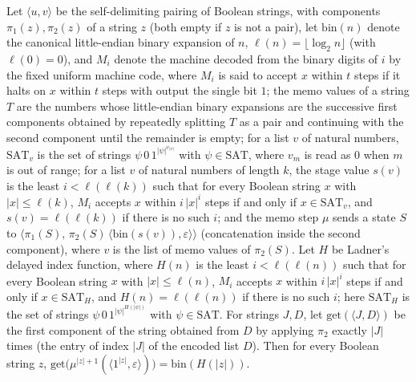 \begin{theorem}
\label{Complexity.ladner_memo_readout}
\leanok
{}
Let $\langle u,v\rangle$ be the self-delimiting pairing of Boolean strings, with components $\pi_1(z),\pi_2(z)$ of a string $z$ (both empty if $z$ is not a pair), let $\mathrm{bin}(n)$ denote the canonical little-endian binary expansion of $n$, $\ell(n)=\lfloor\log_2 n\rfloor$ (with $\ell(0)=0$), and $M_i$ denote the machine decoded from the binary digits of $i$ by the fixed uniform machine code, where $M_i$ is said to accept $x$ within $t$ steps if it halts on $x$ within $t$ steps with output the single bit $1$; the memo values of a string $T$ are the numbers whose little-endian binary expansions are the successive first components obtained by repeatedly splitting $T$ as a pair and continuing with the second component until the remainder is empty; for a list $v$ of natural numbers, $\mathrm{SAT}_v$ is the set of strings $\psi\,0\,1^{|\psi|^{v_{|\psi|}}}$ with $\psi\in\mathrm{SAT}$, where $v_m$ is read as $0$ when $m$ is out of range; for a list $v$ of natural numbers of length $k$, the stage value $s(v)$ is the least $i<\ell(\ell(k))$ such that for every Boolean string $x$ with $|x|\le\ell(k)$, $M_i$ accepts $x$ within $i\,|x|^i$ steps if and only if $x\in\mathrm{SAT}_v$, and $s(v)=\ell(\ell(k))$ if there is no such $i$; and the memo step $\mu$ sends a state $S$ to $\langle\pi_1(S),\,\pi_2(S)\,\langle\mathrm{bin}(s(v)),\varepsilon\rangle\rangle$ (concatenation inside the second component), where $v$ is the list of memo values of $\pi_2(S)$. Let $H$ be Ladner's delayed index function, where $H(n)$ is the least $i<\ell(\ell(n))$ such that for every Boolean string $x$ with $|x|\le\ell(n)$, $M_i$ accepts $x$ within $i\,|x|^i$ steps if and only if $x\in\mathrm{SAT}_H$, and $H(n)=\ell(\ell(n))$ if there is no such $i$; here $\mathrm{SAT}_H$ is the set of strings $\psi\,0\,1^{|\psi|^{H(|\psi|)}}$ with $\psi\in\mathrm{SAT}$. For
strings $J,D$, let $\mathrm{get}(\langle J,D\rangle)$ be the first component of the string obtained
from $D$ by applying $\pi_2$ exactly $|J|$ times (the entry of index $|J|$ of the encoded list $D$).
Then for every Boolean string $z$,
$\mathrm{get}\bigl(\mu^{|z|+1}(\langle 1^{|z|},\varepsilon\rangle)\bigr)=\mathrm{bin}(H(|z|))$.
\end{theorem}

